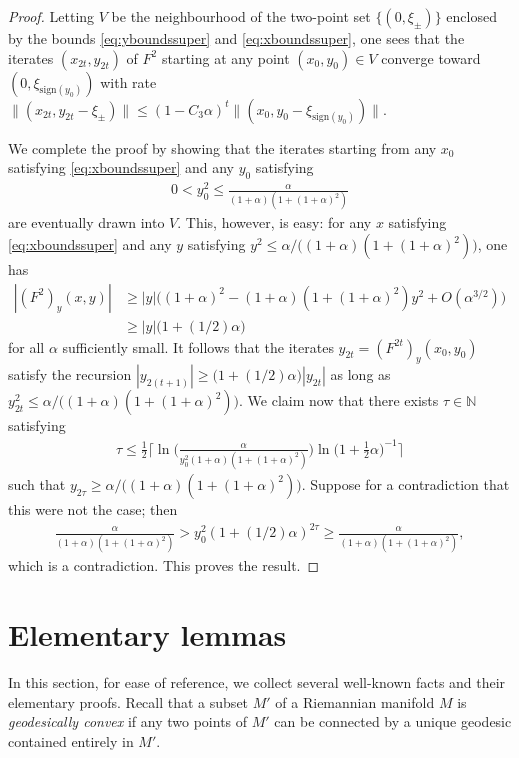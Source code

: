 \documentclass{article}
\newcommand{\NB}{\mathbb{N}}
\theoremstyle{plain}
\theoremstyle{definition}
\theoremstyle{remark}
\begin{document}
\begin{proof}
    Letting $V$ be the neighbourhood of the two-point set $\{(0,\xi_{\pm})\}$ enclosed by the bounds \eqref{eq:yboundssuper} and \eqref{eq:xboundssuper}, one sees that the iterates $(x_{2t},y_{2t})$ of $F^2$ starting at any point $(x_0,y_0)\in V$ converge toward $(0,\xi_{\text{sign}(y_0)})$ with rate $\|(x_{2t},y_{2t}-\xi_{\pm})\|\leq (1-C_3\alpha)^t\|(x_0,y_0-\xi_{\text{sign}(y_0)})\|$.

    We complete the proof by showing that the iterates starting from any $x_0$ satisfying \eqref{eq:xboundssuper} and any $y_0$ satisfying
    \begin{align}
        0<y_0^2\leq \frac{\alpha}{(1+\alpha)(1+(1+\alpha)^2)}
    \end{align}
    are eventually drawn into $V$. This, however, is easy: for any $x$ satisfying \eqref{eq:xboundssuper} and any $y$ satisfying $y^2\leq \alpha/\big((1+\alpha)(1+(1+\alpha)^2)\big)$, one has
    \begin{align}
        |(F^2)_y(x,y)|&\geq |y|\big((1+\alpha)^2 - (1+\alpha)(1+(1+\alpha)^2)y^2 + O(\alpha^{3/2})\big)\\&\geq |y|\big(1+(1/2)\alpha\big)
    \end{align}
    for all $\alpha$ sufficiently small. It follows that the iterates $y_{2t} = (F^{2t})_y(x_0,y_0)$ satisfy the recursion $|y_{2(t+1)}|\geq \big(1+(1/2)\alpha\big)|y_{2t}|$ as long as $y^2_{2t}\leq \alpha/\big((1+\alpha)(1+(1+\alpha)^2)\big)$. We claim now that there exists $\tau\in\NB$ satisfying
    \begin{align}
        \tau\leq \frac{1}{2}\bigg\lceil\ln\bigg(\frac{\alpha}{y_0^2(1+\alpha)(1+(1+\alpha)^2)}\bigg)\ln\bigg(1+\frac{1}{2}\alpha\bigg)^{-1}\bigg\rceil
    \end{align}
    such that $y_{2\tau}\geq \alpha/\big((1+\alpha)(1+(1+\alpha)^2)\big)$. Suppose for a contradiction that this were not the case; then
    \begin{align}
        \frac{\alpha}{(1+\alpha)(1+(1+\alpha)^2)}> y_0^2(1+(1/2)\alpha)^{2\tau}\geq \frac{\alpha}{(1+\alpha)(1+(1+\alpha)^2)},
    \end{align}
    which is a contradiction. This proves the result.
\end{proof}

\section{Elementary lemmas}

In this section, for ease of reference, we collect several well-known facts and their elementary proofs. Recall that a subset $M'$ of a Riemannian manifold $M$ is \emph{geodesically convex} if any two points of $M'$ can be connected by a unique geodesic contained entirely in $M'$.
\end{document}
